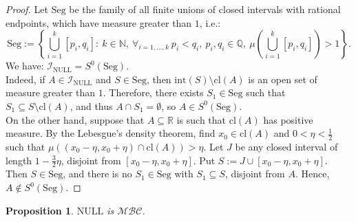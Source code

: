\documentclass{amsart}
\newtheorem{prop}[thm]{Proposition}
\theoremstyle{definition}
\theoremstyle{definition}
\newcommand{\N}{{\mathbb N}}
\newcommand{\R}{{\mathbb R}}
\newcommand{\Q}{{\mathbb Q}}
\newcommand{\calI}{\mathcal{I}}
\newcommand{\MB}{S^0}  %
\newcommand{\MBC}{\mathcal{MBC}}
\newcommand{\Seg}{\mathrm{Seg}}
\newcommand{\NULL}{\mathrm{NULL}}
\newcommand{\INULL}{\calI_\mathrm{NULL}}
\newcommand{\cl}{\mathrm{cl}}
\newcommand{\interior}{\mathrm{int}}
\begin{document}
\begin{proof}
Let $\Seg$ be the family of all finite unions of closed intervals with rational endpoints, which have measure greater than $1$, i.e.:
$$\Seg := \left\{\bigcup_{i=1}^{k}{[p_i,q_i]} :\ k\in\N,\ \forall_{i=1,\ldots,k}\ p_i<q_i,\ p_i,q_i\in\Q,\ \mu\left(\bigcup_{i=1}^{k}{[p_i,q_i]}\right)>1\right\}.$$
We have: $\INULL = \MB(\Seg)$.\\
Indeed, if $A \in \INULL$ and $S\in\Seg$, then $\interior(S) \setminus \cl(A)$ is an open set of measure greater than $1$. Therefore, there exists $S_1\in \Seg$ such that $S_1 \subseteq S \setminus \cl(A)$, and thus $A \cap S_1 =\emptyset$, so $A\in\MB(\Seg)$.\\
On the other hand, suppose that $A\subseteq \R$ is such that $\cl(A)$ has positive measure. By the Lebesgue's density theorem, find $x_0\in\cl(A)$ and $0 < \eta < \frac{1}{2}$ such that $\mu((x_0-\eta, x_0+\eta) \cap \cl(A)) > \eta$. Let $J$ be any closed interval of length $1 - \frac{3}{2}\eta$, disjoint from $[x_0-\eta, x_0+\eta]$. Put $S := J \cup [x_0-\eta, x_0+\eta]$. Then $S\in\Seg$, and there is no $S_1\in\Seg$ with $S_1 \subseteq S$, disjoint from $A$. Hence, $A\notin\MB(\Seg)$.
\end{proof}


\begin{prop}
$\NULL$ is $\MBC$.
\end{prop}
\end{document}

